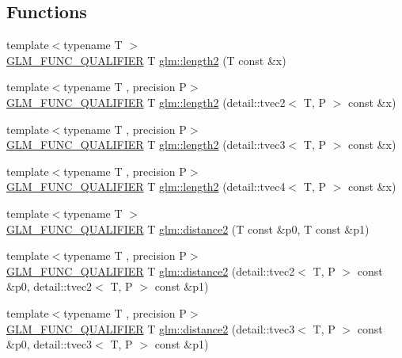 \subsection*{Functions}
\begin{DoxyCompactItemize}
\item 
{\footnotesize template$<$typename T $>$ }\\\hyperlink{setup_8hpp_a33fdea6f91c5f834105f7415e2a64407}{G\+L\+M\+\_\+\+F\+U\+N\+C\+\_\+\+Q\+U\+A\+L\+I\+F\+I\+ER} T \hyperlink{group__gtx__norm_ga08c670024cd230e22f8b853f185ff533}{glm\+::length2} (T const \&x)
\item 
{\footnotesize template$<$typename T , precision P$>$ }\\\hyperlink{setup_8hpp_a33fdea6f91c5f834105f7415e2a64407}{G\+L\+M\+\_\+\+F\+U\+N\+C\+\_\+\+Q\+U\+A\+L\+I\+F\+I\+ER} T \hyperlink{namespaceglm_ac3840f0dc5178071efeb9c431dcdf230}{glm\+::length2} (detail\+::tvec2$<$ T, P $>$ const \&x)
\item 
{\footnotesize template$<$typename T , precision P$>$ }\\\hyperlink{setup_8hpp_a33fdea6f91c5f834105f7415e2a64407}{G\+L\+M\+\_\+\+F\+U\+N\+C\+\_\+\+Q\+U\+A\+L\+I\+F\+I\+ER} T \hyperlink{namespaceglm_acd4e0b768adff0710d0c59aed356d837}{glm\+::length2} (detail\+::tvec3$<$ T, P $>$ const \&x)
\item 
{\footnotesize template$<$typename T , precision P$>$ }\\\hyperlink{setup_8hpp_a33fdea6f91c5f834105f7415e2a64407}{G\+L\+M\+\_\+\+F\+U\+N\+C\+\_\+\+Q\+U\+A\+L\+I\+F\+I\+ER} T \hyperlink{namespaceglm_a5b1d668b8ffd3ec2423ef18e260c2cce}{glm\+::length2} (detail\+::tvec4$<$ T, P $>$ const \&x)
\item 
{\footnotesize template$<$typename T $>$ }\\\hyperlink{setup_8hpp_a33fdea6f91c5f834105f7415e2a64407}{G\+L\+M\+\_\+\+F\+U\+N\+C\+\_\+\+Q\+U\+A\+L\+I\+F\+I\+ER} T \hyperlink{group__gtx__norm_ga3544f6288d3bce2cf2a9f6ebe39e0557}{glm\+::distance2} (T const \&p0, T const \&p1)
\item 
{\footnotesize template$<$typename T , precision P$>$ }\\\hyperlink{setup_8hpp_a33fdea6f91c5f834105f7415e2a64407}{G\+L\+M\+\_\+\+F\+U\+N\+C\+\_\+\+Q\+U\+A\+L\+I\+F\+I\+ER} T \hyperlink{namespaceglm_acd53e249662a44d82b8ec598866aa5b7}{glm\+::distance2} (detail\+::tvec2$<$ T, P $>$ const \&p0, detail\+::tvec2$<$ T, P $>$ const \&p1)
\item 
{\footnotesize template$<$typename T , precision P$>$ }\\\hyperlink{setup_8hpp_a33fdea6f91c5f834105f7415e2a64407}{G\+L\+M\+\_\+\+F\+U\+N\+C\+\_\+\+Q\+U\+A\+L\+I\+F\+I\+ER} T \hyperlink{namespaceglm_a0d982b7f9df34f27a0fd101889deccf9}{glm\+::distance2} (detail\+::tvec3$<$ T, P $>$ const \&p0, detail\+::tvec3$<$ T, P $>$ const \&p1)

\end{DoxyCompactItemize}
